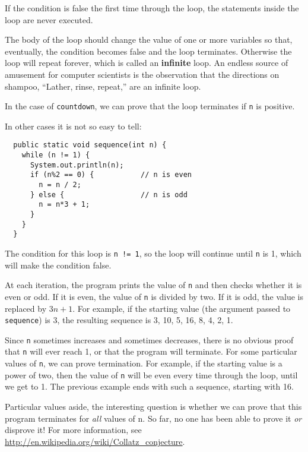 \documentclass[12pt]{book}
\theoremstyle{definition}
\begin{document}
If the condition is false the
first time through the loop, the statements inside the loop are
never executed.  


The body of the loop should change the value of
one or more variables so that, eventually, the condition becomes
false and the loop terminates.  Otherwise the loop will repeat
forever, which is called an {\bf infinite} loop.  An endless
source of amusement for computer scientists is the observation
that the directions on shampoo, ``Lather, rinse, repeat,'' are
an infinite loop.

In the case of {\tt countdown}, we can prove that the loop
terminates if {\tt n} is positive.

In other cases it is not so easy to tell:

\begin{lstlisting}
  public static void sequence(int n) {
    while (n != 1) {
      System.out.println(n);
      if (n%2 == 0) {           // n is even
        n = n / 2;
      } else {                  // n is odd
        n = n*3 + 1;
      }
    }
  }
\end{lstlisting}
%
The condition for this loop is {\tt n != 1}, so the loop
will continue until {\tt n} is 1, which will make the condition
false.

At each iteration, the program prints the value of {\tt n} and then
checks whether it is even or odd.  If it is even, the value of
{\tt n} is divided by two.  If it is odd, the value is replaced
by $3n+1$.  For example, if the starting value (the argument passed
to {\tt sequence}) is 3, the resulting sequence is
3, 10, 5, 16, 8, 4, 2, 1.

Since {\tt n} sometimes increases and sometimes decreases, there is no
obvious proof that {\tt n} will ever reach 1, or that the program will
terminate.  For some particular values of {\tt n}, we can prove
termination.  For example, if the starting value is a power of two, then
the value of {\tt n} will be even every time through the loop, until
we get to 1.  The previous example ends with such a sequence,
starting with 16.

Particular values aside, the interesting question is whether
we can prove that this program terminates for {\em all} values of n.
So far, no one has been able to prove it {\em or} disprove it!
For more information, see \url{http://en.wikipedia.org/wiki/Collatz_conjecture}.
\end{document}
